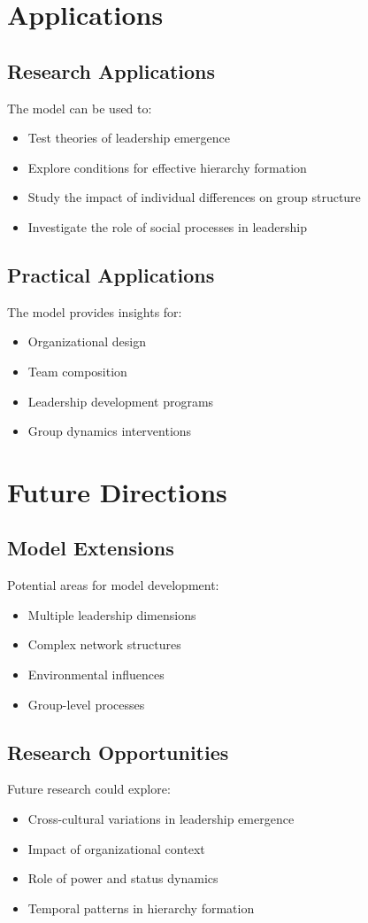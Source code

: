 \documentclass[12pt]{article}
\begin{document}
\section{Applications}

\subsection{Research Applications}
The model can be used to:
\begin{itemize}
    \item Test theories of leadership emergence
    \item Explore conditions for effective hierarchy formation
    \item Study the impact of individual differences on group structure
    \item Investigate the role of social processes in leadership
\end{itemize}

\subsection{Practical Applications}
The model provides insights for:
\begin{itemize}
    \item Organizational design
    \item Team composition
    \item Leadership development programs
    \item Group dynamics interventions
\end{itemize}

\section{Future Directions}

\subsection{Model Extensions}
Potential areas for model development:
\begin{itemize}
    \item Multiple leadership dimensions
    \item Complex network structures
    \item Environmental influences
    \item Group-level processes
\end{itemize}

\subsection{Research Opportunities}
Future research could explore:
\begin{itemize}
    \item Cross-cultural variations in leadership emergence
    \item Impact of organizational context
    \item Role of power and status dynamics
    \item Temporal patterns in hierarchy formation
\end{itemize}
\end{document}
